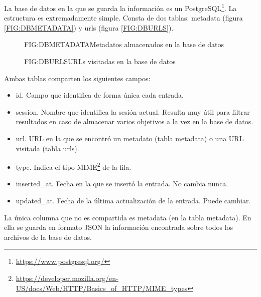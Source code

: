 La base de datos en la que se guarda la información es un PostgreSQL\footnote{\url{https://www.postgresql.org/}}. La estructura es extremadamente simple. Consta de dos tablas: metadata (figura \ref{FIG:DBMETADATA}) y urls (figura \ref{FIG:DBURLS}).

\begin{figure}[dbmetadata]{FIG:DBMETADATA}{Metadatos almacenados en la base de datos}
\end{figure}

\begin{figure}[dburls]{FIG:DBURLS}{URLs visitadas en la base de datos}
\end{figure}

Ambas tablas comparten los siguientes campos:
\begin{itemize}
  \item id. Campo que identifica de forma única cada entrada.
  \item session. Nombre que identifica la sesión actual. Resulta muy útil para filtrar resultados en caso de almacenar varios objetivos a la vez en la base de datos.
  \item url. URL en la que se encontró un metadato (tabla metadata) o una URL visitada (tabla urls).
  \item type. Indica el tipo MIME\footnote{\url{https://developer.mozilla.org/en-US/docs/Web/HTTP/Basics_of_HTTP/MIME_types}} de la fila.
  \item inserted\_at. Fecha en la que se insertó la entrada. No cambia nunca.
  \item updated\_at. Fecha de la última actualización de la entrada. Puede cambiar.
\end{itemize}

La única columna que no es compartida es metadata (en la tabla metadata). En ella se guarda en formato JSON la información encontrada sobre todos los archivos de la base de datos.
